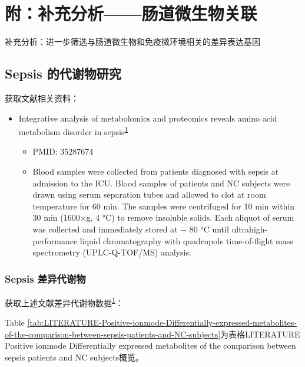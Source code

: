 \documentclass[
]{article}
\providecommand{\tightlist}{%
  \setlength{\itemsep}{0pt}\setlength{\parskip}{0pt}}
\begin{document}
\hypertarget{supp}{%
\section{附：补充分析------肠道微生物关联}\label{supp}}

补充分析：进一步筛选与肠道微生物和免疫微环境相关的差异表达基因

\hypertarget{sepsis-ux7684ux4ee3ux8c22ux7269ux7814ux7a76}{%
\subsection{Sepsis 的代谢物研究}\label{sepsis-ux7684ux4ee3ux8c22ux7269ux7814ux7a76}}

获取文献相关资料：

\begin{itemize}
\tightlist
\item
  Integrative analysis of metabolomics and proteomics reveals amino acid
  metabolism disorder in sepsis\textsuperscript{\protect\hyperlink{ref-IntegrativeAnaChen2022}{1}}

  \begin{itemize}
  \tightlist
  \item
    PMID: 35287674
  \item
    Blood samples were collected from patients diagnosed with sepsis at
    admission to the ICU. Blood samples of patients and NC subjects were
    drawn using serum separation tubes and allowed to clot at room
    temperature for 60 min. The samples were centrifuged for 10 min within 30
    min (1600×g, 4 °C) to remove insoluble solids. Each aliquot of serum was
    collected and immediately stored at − 80 °C until ultrahigh-performance
    liquid chromatography with quadrupole time-of-flight mass spectrometry
    (UPLC-Q-TOF/MS) analysis.
  \end{itemize}
\end{itemize}

\hypertarget{diff-meta}{%
\subsubsection{Sepsis 差异代谢物}\label{diff-meta}}

获取上述文献差异代谢物数据\textsuperscript{\protect\hyperlink{ref-IntegrativeAnaChen2022}{1}}：

Table \ref{tab:LITERATURE-Positive-ionmode-Differentially-expressed-metabolites-of-the-comparison-between-sepsis-patients-and-NC-subjects}为表格LITERATURE Positive ionmode Differentially expressed metabolites of the comparison between sepsis patients and NC subjects概览。
\end{document}
